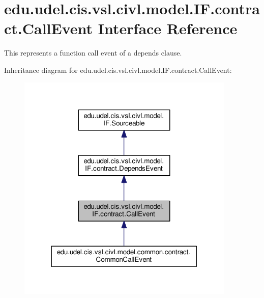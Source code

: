 \hypertarget{interfaceedu_1_1udel_1_1cis_1_1vsl_1_1civl_1_1model_1_1IF_1_1contract_1_1CallEvent}{}\section{edu.\+udel.\+cis.\+vsl.\+civl.\+model.\+I\+F.\+contract.\+Call\+Event Interface Reference}
\label{interfaceedu_1_1udel_1_1cis_1_1vsl_1_1civl_1_1model_1_1IF_1_1contract_1_1CallEvent}


This represents a function call event of a {\ttfamily depends} clause.  




Inheritance diagram for edu.\+udel.\+cis.\+vsl.\+civl.\+model.\+I\+F.\+contract.\+Call\+Event\+:
\nopagebreak
\begin{figure}[H]
\begin{center}
\leavevmode
\includegraphics[width=294pt]{interfaceedu_1_1udel_1_1cis_1_1vsl_1_1civl_1_1model_1_1IF_1_1contract_1_1CallEvent__inherit__graph}
\end{center}
\end{figure}


